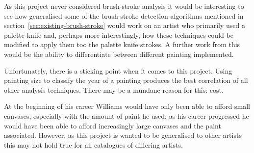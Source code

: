 As this project never considered brush-stroke analysis it would be interesting to see how 
generalised some of the brush-stroke detection algorithms mentioned in 
section~\ref{sec:existing-brush-stroke} would work on an artist who primarily used a palette knife and,
perhaps more interestingly, how these techniques could be modified to apply them too the palette 
knife strokes. A further work from this would be the ability to differentiate between different
painting implemented.


Unfortunately, there is a sticking point when it comes to this project. Using painting size to 
classify the year of a painting produces the best correlation of all other analysis techniques.
There may be a mundane reason for this: cost.

At the beginning of his career Williams would have only been able to afford small canvases, 
especially with the amount of paint he used; as his career progressed he would have been able
to afford increasingly large canvases and the paint associated. However, as this project is wanted
to be generalised to other artists this may not hold true for all catalogues of differing artists.
